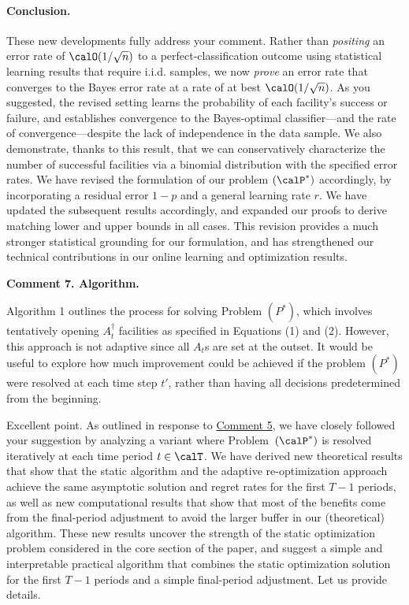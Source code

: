 \documentclass[11pt]{article}
\begin{document}
\paragraph{Conclusion.}
These new developments fully address your comment. Rather than \textit{positing} an error rate of $\calO(1/\sqrt n)$ to a perfect-classification outcome using statistical learning results that require i.i.d. samples, we now \textit{prove} an error rate that converges to the Bayes error rate at a rate of at best $\calO(1/\sqrt n)$. As you suggested, the revised setting learns the probability of each facility's success or failure, and establishes convergence to the Bayes-optimal classifier---and the rate of convergence---despite the lack of independence in the data sample. We also demonstrate, thanks to this result, that we can conservatively characterize the number of successful facilities via a binomial distribution with the specified error rates. We have revised the formulation of our problem $(\calP^*)$ accordingly, by incorporating a residual error $1-p$ and a general learning rate $r$. We have updated the subsequent results accordingly, and expanded our proofs to derive matching lower and upper bounds in all cases. This revision provides a much stronger statistical grounding for our formulation, and has strengthened our technical contributions in our online learning and optimization results.

\begin{commentBox}
    \textbf{Comment 7. Algorithm.}\label{R2:7}

    Algorithm 1 outlines the process for solving Problem $(P^*)$, which involves tentatively opening $A_t^\dagger$ facilities as specified in Equations (1) and (2). However, this approach is not adaptive since all $A_t$s are set at the outset. It would be useful to explore how much improvement could be achieved if the problem $(P^*)$ were resolved at each time step $t'$, rather than having all decisions predetermined from the beginning.
\end{commentBox}

Excellent point. As outlined in response to \hyperref[R2:5]{\color{blue}Comment 5}, we have closely followed your suggestion by analyzing a variant where Problem~$(\calP^*)$ is resolved iteratively at each time period $t\in\calT$. We have derived new theoretical results that show that the static algorithm and the adaptive re-optimization approach achieve the same asymptotic solution and regret rates for the first $T-1$ periods, as well as new computational results that show that most of the benefits come from the final-period adjustment to avoid the larger buffer in our (theoretical) algorithm. These new results uncover the strength of the static optimization problem considered in the core section of the paper, and suggest a simple and interpretable practical algorithm that combines the static optimization solution for the first $T-1$ periods and a simple final-period adjustment. Let us provide details.
\end{document}
